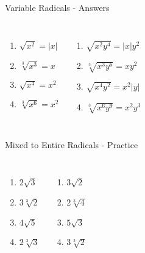 \documentclass[aspectratio=169]{beamer}
\begin{document}
\begin{frame}{Variable Radicals - Answers}
\begin{tcolorbox}[colback=lightgray,colframe=primary,title=Solutions]
\footnotesize
\begin{columns}[T]
\begin{enumerate}
  \item $\sqrt{x^2} = |x|$
  \item $\sqrt[3]{x^3} = x$
  \item $\sqrt{x^4} = x^2$
  \item $\sqrt[3]{x^6} = x^2$
\end{enumerate}
\begin{enumerate}
  \item $\sqrt{x^2y^4} = |x|y^2$
  \item $\sqrt[3]{x^3y^6} = xy^2$
  \item $\sqrt{x^4y^2} = x^2|y|$
  \item $\sqrt[3]{x^6y^9} = x^2y^3$
\end{enumerate}
\end{columns}
\end{tcolorbox}
\end{frame}

\begin{frame}{Mixed to Entire Radicals - Practice}
\begin{tcolorbox}[colback=lightgray,colframe=accent,title=Practice Problems]
\footnotesize
\begin{columns}[T]
\begin{enumerate}
  \item $2\sqrt{3}$
  \item $3\sqrt[3]{2}$
  \item $4\sqrt{5}$
  \item $2\sqrt[3]{3}$
\end{enumerate}
\begin{enumerate}
  \item $3\sqrt{2}$
  \item $2\sqrt[3]{4}$
  \item $5\sqrt{3}$
  \item $3\sqrt[3]{2}$
\end{enumerate}
\end{columns}
\end{tcolorbox}
\end{frame}
\end{document}
